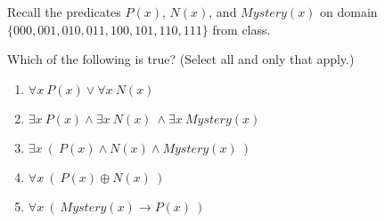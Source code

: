 
Recall the predicates $P(x)$, $N(x)$, and $Mystery(x)$
on domain $\{000,001,010,011,100,101,110,111\}$ from class.

Which of the following is true? (Select  all and only that apply.)
 \begin{enumerate}
    \item $\forall x ~P(x) \lor \forall x ~N(x)$
    \item $\exists x ~P(x) \land \exists x~N(x) ~\land \exists x~Mystery(x)$
    \item $\exists x ~(~P(x) \land N(x) \land Mystery(x)~)$
    \item $\forall x ~(~P(x) \oplus N(x)~)$
    \item $\forall x ~(~Mystery(x) \to P(x)~)$
 \end{enumerate}   